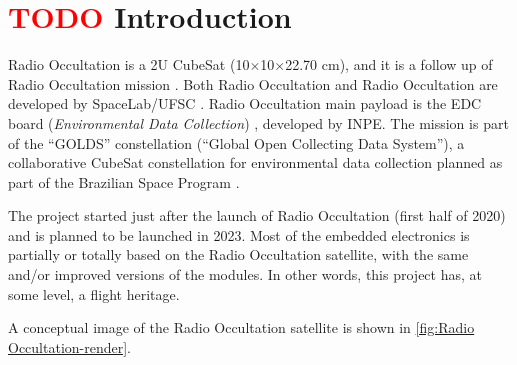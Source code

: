 %
%
%
%
%

%
%
%
%
%
%

\chapter{ \textcolor{red}{TODO} Introduction} \label{ch:introduction}

Radio Occultation is a 2U CubeSat (10$\times$10$\times$22.70 cm), and it is a follow up of Radio Occultation mission \cite{floripasat}. Both Radio Occultation and Radio Occultation are developed by SpaceLab/UFSC \cite{spacelab}. Radio Occultation main payload is the EDC board (\textit{Environmental Data Collection}) \cite{edc}, developed by INPE. The mission is part of the ``GOLDS'' constellation (``Global Open Collecting Data System''), a collaborative CubeSat constellation for environmental data collection planned as part of the Brazilian Space Program \cite{golds}.

The project started just after the launch of Radio Occultation (first half of 2020) and is planned to be launched in 2023. Most of the embedded electronics is partially or totally based on the Radio Occultation satellite, with the same and/or improved versions of the modules. In other words, this project has, at some level, a flight heritage.

A conceptual image of the Radio Occultation satellite is shown in \autoref{fig:Radio Occultation-render}.

